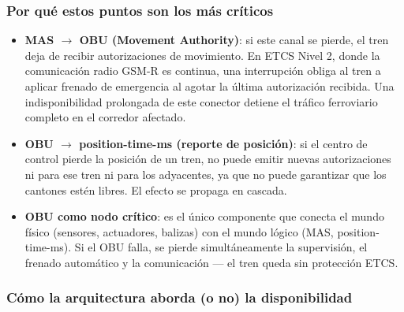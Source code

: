 \documentclass[a4paper, 10 pt]{article}
\begin{document}
\subsubsection{Por qué estos puntos son los más críticos}

\begin{itemize}
    \item \textbf{MAS $\rightarrow$ OBU (Movement Authority)}: si este canal se pierde, el tren deja de recibir autorizaciones de movimiento. En ETCS Nivel 2, donde la comunicación radio GSM-R es continua, una interrupción obliga al tren a aplicar frenado de emergencia al agotar la última autorización recibida. Una indisponibilidad prolongada de este conector detiene el tráfico ferroviario completo en el corredor afectado.
    \item \textbf{OBU $\rightarrow$ position-time-ms (reporte de posición)}: si el centro de control pierde la posición de un tren, no puede emitir nuevas autorizaciones ni para ese tren ni para los adyacentes, ya que no puede garantizar que los cantones estén libres. El efecto se propaga en cascada.
    \item \textbf{OBU como nodo crítico}: es el único componente que conecta el mundo físico (sensores, actuadores, balizas) con el mundo lógico (MAS, position-time-ms). Si el OBU falla, se pierde simultáneamente la supervisión, el frenado automático y la comunicación --- el tren queda sin protección ETCS.
\end{itemize}

\subsubsection{Cómo la arquitectura aborda (o no) la disponibilidad}
\end{document}
